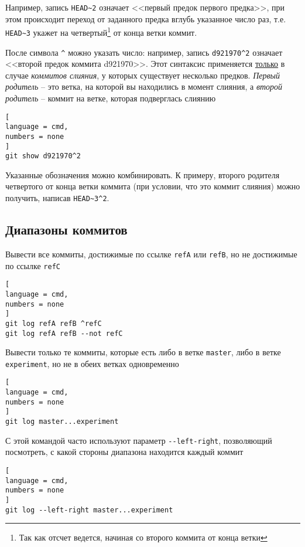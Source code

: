 \documentclass[%
	11pt,
	a4paper,
	utf8,
		]{article}
\begin{document}
Например, запись \lstinline{HEAD~2} означает <<первый предок первого предка>>, при этом происходит переход от заданного предка вглубь указанное число раз, т.е. \lstinline{HEAD~3} укажет на четвертый\footnote{Так как отсчет ведется, начиная со второго коммита от конца ветки} от конца ветки коммит.

После символа \lstinline{^} можно указать число: например, запись \lstinline{d921970^2} означает <<второй предок коммита d921970>>. Этот синтаксис применяется \underline{только} в случае \emph{коммитов слияния}, у которых существует несколько предков. \emph{Первый родитель} -- это ветка, на которой вы находились в момент слияния, а \emph{второй родитель} -- коммит на ветке, которая подверглась слиянию

\begin{lstlisting}[
language = cmd,
numbers = none
]
git show d921970^2
\end{lstlisting}

Указанные обозначения можно комбинировать. К примеру, второго родителя четвертого от конца ветки коммита (при условии, что это коммит слияния) можно получить, написав \lstinline{HEAD~3^2}.

\subsection{Диапазоны коммитов}

Вывести все коммиты, достижимые по ссылке \texttt{refA} или \texttt{refB}, но не достижимые по ссылке \texttt{refC}

\begin{lstlisting}[
language = cmd,
numbers = none
]
git log refA refB ^refC
git log refA refB --not refC
\end{lstlisting}

Вывести только те коммиты, которые есть либо в ветке \texttt{master}, либо в ветке \texttt{experiment}, но не в обеих ветках одновременно

\begin{lstlisting}[
language = cmd,
numbers = none
]
git log master...experiment
\end{lstlisting}

С этой командой часто используют параметр \lstinline{--left-right}, позволяющий посмотреть, с какой стороны диапазона находится каждый коммит

\begin{lstlisting}[
language = cmd,
numbers = none
]
git log --left-right master...experiment
\end{lstlisting}
\end{document}
